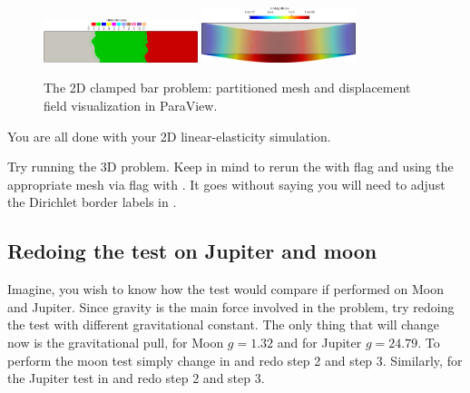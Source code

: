 \begin{figure}[h!]
\centering
\includegraphics[align=t,width=0.4\textwidth]{./Images/le-2d-bar-partitioned3.png}\hfill
\includegraphics[align=t,width=0.4\textwidth]{./Images/le-2d-bar-clamped-ends.png}
\caption{The 2D clamped bar problem: partitioned mesh and displacement field visualization in ParaView. \label{bar-le-full-n}}
\end{figure}

You are all done with your 2D linear-elasticity simulation.

Try running the 3D problem. Keep in mind to rerun the
 with  flag and using the
appropriate mesh via  flag with . It goes
without saying you will need to adjust the Dirichlet border labels in
.

\subsection{Redoing the test on Jupiter and moon}

Imagine, you wish to know how the test would compare if performed on
Moon and Jupiter. Since gravity is the main force involved in the
problem, try redoing the test with different gravitational constant. The
only thing that will change now is the gravitational pull, for Moon
\(g=1.32\) and for Jupiter \(g=24.79\). To perform the moon test simply
change  in  and redo
step 2 and step 3. Similarly, for the Jupiter test
 in  and redo step 2
and step 3.

